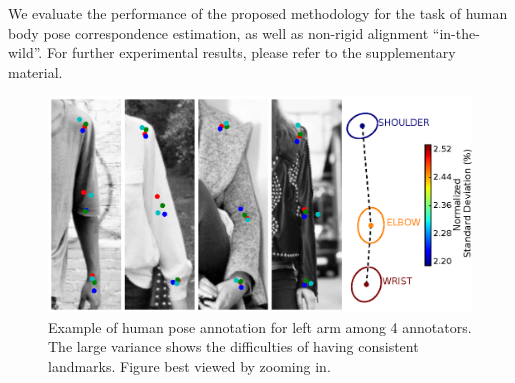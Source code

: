 
We evaluate the performance of the proposed methodology for the task of human body pose correspondence estimation, as well as non-rigid alignment ``in-the-wild''. For further experimental results, please refer to the supplementary material.


\begin{figure}[t!]
    \centering
    \includegraphics[width=\columnwidth]{resources/Fig_Variance/final}
    \caption{Example of human pose annotation for left arm among 4 annotators. The large variance shows the difficulties of having consistent landmarks. Figure best viewed by zooming in.}
    \label{fig:variance}
\end{figure}

